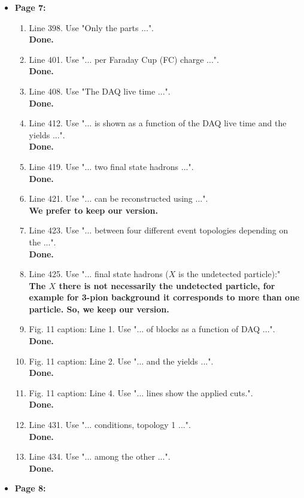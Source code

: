\documentclass[,superscriptaddress,showpacs,amssymb,amsmath,amsfonts,linenumbers,article]{revtex4-1}
\begin{document}
\begin{itemize}
\item {\bf \large  Page 7:}
\begin{enumerate} 

\item Line 398. Use "Only the parts ...".\\
{\bf Done.}
\item Line 401. Use "... per Faraday Cup (FC) charge ...".\\
{\bf Done.}
\item Line 408. Use "The DAQ live time ...".\\
{\bf Done.}
\item Line 412. Use "... is shown as a function of the DAQ live time and the yields ...".\\
{\bf Done.}
\item Line 419. Use "... two final state hadrons ...".\\
{\bf Done.}
\item Line 421. Use "... can be reconstructed using ...".\\
{\bf We prefer to keep our version.}
\item Line 423. Use "... between four different event topologies depending on the ...".\\
{\bf Done.}
\item Line 425. Use "... final state hadrons ($X$ is the undetected particle):"\\
{\bf The $X$ there is not necessarily the undetected particle, for example for 3-pion background it corresponds to more than one particle. So, we keep our version.}
\item Fig. 11 caption: Line 1. Use "... of blocks as a function of DAQ ...".\\
{\bf Done.}
\item Fig. 11 caption: Line 2. Use "... and the yields ...".\\
{\bf Done.}
\item Fig. 11 caption: Line 4. Use "... lines show the applied cuts.".\\
{\bf Done.}
\item Line 431. Use "... conditions, topology 1 ...".\\
{\bf Done.}
\item Line 434. Use "... among the other ...".\\
{\bf Done.}

\end{enumerate}


\item {\bf \large  Page 8:}
\begin{enumerate} 


\end{enumerate}
\end{itemize}
\end{document}
